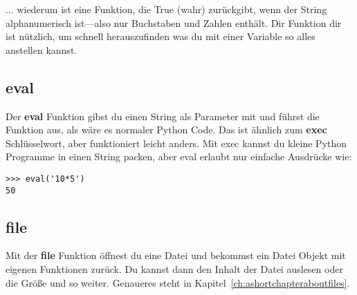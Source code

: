 \texorpdfstring{$\ldots$}{...} wiederum ist eine Funktion, die True (wahr) zurückgibt, wenn der String alphanumerisch ist---also nur Buchstaben und Zahlen enthält. Dir Funktion dir ist nützlich, um schnell herauszufinden was du mit einer Variable so alles anstellen kannst. 

\subsection*{eval}

Der \textbf{eval} Funktion gibst du einen String als Parameter mit und führst die Funktion aus, als wäre es normaler Python Code. Das ist ähnlich zum \textbf{exec} Schlüsselwort, aber funktioniert leicht anders. Mit exec kannst du kleine Python Programme in einen String packen, aber eval erlaubt nur einfache Ausdrücke wie:

\begin{Verbatim}[frame=single]
>>> eval('10*5')
50
\end{Verbatim}

\subsection*{file}

Mit der \textbf{file} Funktion öffnest du eine Datei und bekommst ein Datei Objekt mit eigenen Funktionen zurück. Du kannst dann den Inhalt der Datei auslesen oder die Größe und so weiter. Genaueres steht in Kapitel~\ref{ch:ashortchapteraboutfiles}.

